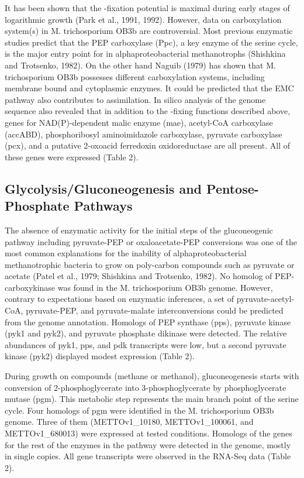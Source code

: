 It has been shown that the -fixation potential is maximal during early stages of logarithmic growth (Park et al., 1991, 1992).
However, data on carboxylation system(s) in M. trichosporium OB3b are controversial.
Most previous enzymatic studies predict that the PEP carboxylase (Ppc), a key enzyme of the serine cycle, is the major entry point for  in alphaproteobacterial methanotrophs (Shishkina and Trotsenko, 1982).
On the other hand Naguib (1979) has shown that M. trichosporium OB3b possesses different carboxylation systems, including membrane bound and cytoplasmic enzymes.
It could be predicted that the EMC pathway also contributes to  assimilation.
In silico analysis of the genome sequence also revealed that in addition to the -fixing functions described above, genes for NAD(P)-dependent malic enzyme (mae), acetyl-CoA carboxylase (accABD), phosphoribosyl aminoimidazole carboxylase, pyruvate carboxylase (pcx), and a putative 2-oxoacid ferredoxin oxidoreductase are all present.
All of these genes were expressed (Table 2).

\subsection{Glycolysis/Gluconeogenesis and Pentose-Phosphate Pathways}
The absence of enzymatic activity for the initial steps of the gluconeogenic pathway including pyruvate-PEP or oxaloacetate-PEP conversions was one of the most common explanations for the inability of alphaproteobacterial methanotrophic bacteria to grow on poly-carbon compounds such as pyruvate or acetate (Patel et al., 1979; Shishkina and Trotsenko, 1982).
No homolog of PEP-carboxykinase was found in the M. trichosporium OB3b genome.
However, contrary to expectations based on enzymatic inferences, a set of pyruvate-acetyl-CoA, pyruvate-PEP, and pyruvate-malate interconversions could be predicted from the genome annotation.
Homologs of PEP synthase (pps), pyruvate kinase (pyk1 and pyk2), and pyruvate phosphate dikinase were detected.
The relative abundances of pyk1, pps, and pdk transcripts were low, but a second pyruvate kinase (pyk2) displayed modest expression (Table 2).

During growth on  compounds (methane or methanol), gluconeogenesis starts with conversion of 2-phosphoglycerate into 3-phosphoglycerate by phosphoglycerate mutase (pgm).
This metabolic step represents the main branch point of the serine cycle.
Four homologs of pgm were identified in the M. trichosporium OB3b genome.
Three of them (METTOv1\_10180, METTOv1\_100061, and METTOv1\_680013) were expressed at tested conditions.
Homologs of the genes for the rest of the enzymes in the pathway were detected in the genome, mostly in single copies.
All gene transcripts were observed in the RNA-Seq data (Table 2).

